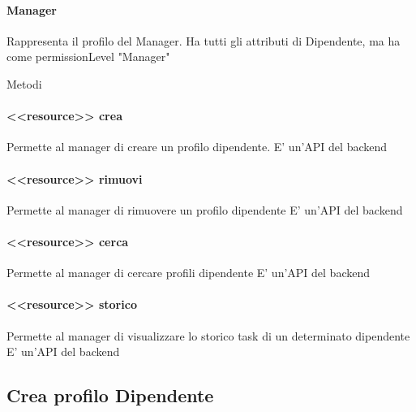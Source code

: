 \documentclass{report}
\begin{document}
\paragraph*{Manager}
Rappresenta il profilo del Manager.
Ha tutti gli attributi di Dipendente, ma ha come permissionLevel "Manager"

Metodi
\paragraph*{<<resource>> crea}
Permette al manager di creare un profilo dipendente.
E' un'API del backend
\paragraph*{<<resource>> rimuovi}
Permette al manager di rimuovere un profilo dipendente
E' un'API del backend
\paragraph*{<<resource>> cerca}
Permette al manager di cercare profili dipendente
E' un'API del backend
\paragraph*{<<resource>> storico}
Permette al manager di visualizzare lo storico task di un determinato dipendente
E' un'API del backend

\subsection{Crea profilo Dipendente}
\end{document}
